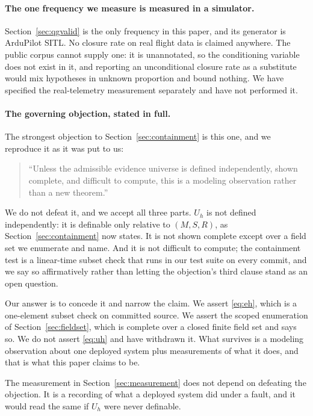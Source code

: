 \documentclass[11pt,a4paper]{article}
\begin{document}
\paragraph{The one frequency we measure is measured in a simulator.}
Section~\ref{sec:qgvalid} is the only frequency in this paper, and its
generator is ArduPilot SITL. No closure rate on real flight data is claimed
anywhere. The public corpus cannot supply one: it is unannotated, so the
conditioning variable does not exist in it, and reporting an unconditional
closure rate as a substitute would mix hypotheses in unknown proportion and
bound nothing. We have specified the real-telemetry measurement separately and
have not performed it.

\paragraph{The governing objection, stated in full.} The strongest objection to
Section~\ref{sec:containment} is this one, and we reproduce it as it was put to
us:

\begin{quote}
``Unless the admissible evidence universe is defined independently, shown
complete, and difficult to compute, this is a modeling observation rather than
a new theorem.''
\end{quote}

We do not defeat it, and we accept all three parts. $U_h$ is not defined
independently: it is definable only relative to $(M, S, R)$, as
Section~\ref{sec:containment} now states. It is not shown complete except over
a field set we enumerate and name. And it is not difficult to compute; the
containment test is a linear-time subset check that runs in our test suite on
every commit, and we say so affirmatively rather than letting the objection's
third clause stand as an open question.

Our answer is to concede it and narrow the claim. We assert \eqref{eq:eh},
which is a one-element subset check on committed source. We assert the scoped
enumeration of Section~\ref{sec:fieldset}, which is complete over a closed
finite field set and says so. We do not assert \eqref{eq:uh} and have withdrawn
it. What survives is a modeling observation about one deployed system plus
measurements of what it does, and that is what this paper claims to be.

The measurement in Section~\ref{sec:measurement} does not depend on defeating
the objection. It is a recording of what a deployed system did under a fault,
and it would read the same if $U_h$ were never definable.
\end{document}
